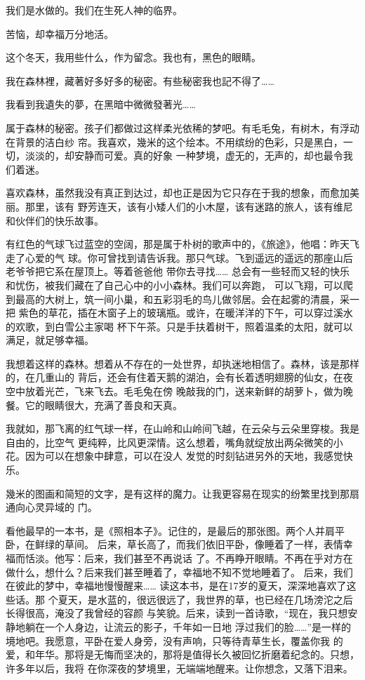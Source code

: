 		我们是水做的。我们在生死人神的临界。

		苦恼，却幸福万分地活。

		这个冬天，我用些什么，作为留念。我也有，黑色的眼睛。

	\endwriting



		我在森林裡，藏著好多好多的秘密。有些秘密我也記不得了……

		我看到我遺失的夢，在黑暗中微微發著光……


		属于森林的秘密。孩子们都做过这样柔光依稀的梦吧。有毛毛兔，有树木，有浮动在背景的洁白纱
	帘。我喜欢，幾米的这个绘本。不用缤纷的色彩，只是黑白，一切，淡淡的，却安静而可爱。真的好象
	一种梦境，虚无的，无声的，却也最令我们着迷。

		喜欢森林，虽然我没有真正到达过，却也正是因为它只存在于我的想象，而愈加美丽。那里，该有
	野芳连天，该有小矮人们的小木屋，该有迷路的旅人，该有维尼和伙伴们的快乐故事。

		有红色的气球飞过蓝空的空阔，那是属于朴树的歌声中的，《旅途》，他唱：昨天飞走了心爱的气
	球。你可曾找到请告诉我。那只气球。飞到遥远的遥远的那座山后老爷爷把它系在屋顶上。等着爸爸他
	带你去寻找…… 总会有一些轻而又轻的快乐和忧伤，被我们藏在了自己心中的小小森林。我们可以奔跑，
	可以飞翔，可以爬到最高的大树上，筑一间小巢，和五彩羽毛的鸟儿做邻居。会在起雾的清晨，采一把
	紫色的草花，插在木窗子上的玻璃瓶。或许，在暖洋洋的下午，可以穿过溪水的欢歌，到白雪公主家喝
	杯下午茶。只是手扶着树干，照着温柔的太阳，就可以满足，就足够幸福。

		我想着这样的森林。想着从不存在的一处世界，却执迷地相信了。森林，该是那样的，在几重山的
	背后，还会有住着天鹅的湖泊，会有长着透明翅膀的仙女，在夜空中放着光芒，飞来飞去。毛毛兔在傍
	晚敲我的门，送来新鲜的胡萝卜，做为晚餐。它的眼睛很大，充满了善良和天真。

		我就如，那飞离的红气球一样，在山岭和山岭间飞越，在云朵与云朵里穿梭。我是自由的，比空气
	更纯粹，比风更深情。这么想着，嘴角就绽放出两朵微笑的小花。因为可以在想象中肆意，可以在没人
	发觉的时刻钻进另外的天地，我感觉快乐。

		幾米的图画和简短的文字，是有这样的魔力。让我更容易在现实的纷繁里找到那扇通向心灵异域的
	门。

		看他最早的一本书，是《照相本子》。记住的，是最后的那张图。两个人并肩平卧，在鲜绿的草间。
	后来，草长高了，而我们依旧平卧，像睡着了一样，表情幸福而恬淡。他写：后来，我们甚至不再说话
	了。不再睁开眼睛。不再在乎对方在做什么，想什么？后来我们甚至睡着了，幸福地不知不觉地睡着了。
	后来，我们在彼此的梦中，幸福地慢慢醒来…… 读这本书，是在17岁的夏天，深深地喜欢了这些话。那
	个夏天，是水蓝的，很远很远了，我世界的草，也已经在几场滂沱之后长得很高，淹没了我曾经的容颜
	与笑貌。后来，读到一首诗歌，“现在，我只想安静地躺在一个人身边，让流云的影子，千年如一日地
	浮过我们的脸……”是一样的境地吧。我愿意，平卧在爱人身旁，没有声响，只等待青草生长，覆盖你我
	的爱，和年华。那将是无悔而坚决的，那将是值得长久被回忆折磨着纪念的。只想，许多年以后，我将
	在你深夜的梦境里，无端端地醒来。让你想念，又落下泪来。


